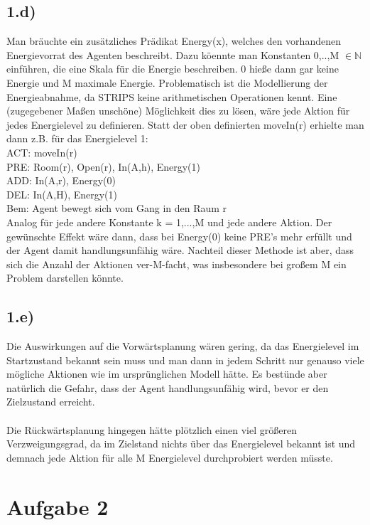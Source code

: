 \documentclass[a4paper]{article}
\newcommand{\IN}{\mathbb{N}}
\begin{document}
\subsection*{1.d)}
Man br\"auchte ein zus\"atzliches Pr\"adikat Energy(x), welches den vorhandenen Energievorrat des Agenten beschreibt. Dazu k\"oennte man Konstanten 0,..,M $\in \IN$ einf\"uhren, die eine Skala f\"ur die Energie beschreiben. 0 hie{\ss}e dann gar keine Energie und M maximale Energie. Problematisch ist die Modellierung der Energieabnahme, da STRIPS keine arithmetischen Operationen kennt. Eine (zugegebener Ma{\ss}en unsch\"one) M\"oglichkeit dies zu l\"osen, w\"are jede Aktion f\"ur jedes Energielevel zu definieren. Statt der oben definierten moveIn(r) erhielte man dann z.B. f\"ur das Energielevel 1:\\

ACT: moveIn(r)\\
PRE: Room(r), Open(r), In(A,h), Energy(1)\\
ADD: In(A,r), Energy(0)\\
DEL: In(A,H), Energy(1)\\
Bem: Agent bewegt sich vom Gang in den Raum r\\

Analog f\"ur jede andere Konstante k = 1,...,M und jede andere Aktion. Der gew\"unschte Effekt w\"are dann, dass bei Energy(0) keine PRE's mehr erf\"ullt und der Agent damit handlungsunf\"ahig w\"are. Nachteil dieser Methode ist aber, dass sich die Anzahl der Aktionen ver-M-facht, was insbesondere bei gro{\ss}em M ein Problem darstellen k\"onnte.

\subsection*{1.e)}
Die Auswirkungen auf die Vorw\"artsplanung w\"aren gering, da das Energielevel im Startzustand bekannt sein muss und man dann in jedem Schritt nur genauso viele m\"ogliche Aktionen wie im urspr\"unglichen Modell h\"atte. Es best\"unde aber nat\"urlich die Gefahr, dass der Agent handlungsunf\"ahig wird, bevor er den Zielzustand erreicht. \\
\\
Die R\"uckw\"artsplanung hingegen h\"atte pl\"otzlich einen viel gr\"o{\ss}eren Verzweigungsgrad, da im Zielstand nichts \"uber das Energielevel bekannt ist und demnach jede Aktion f\"ur alle M Energielevel durchprobiert werden m\"usste.

\section*{Aufgabe 2}
\end{document}
